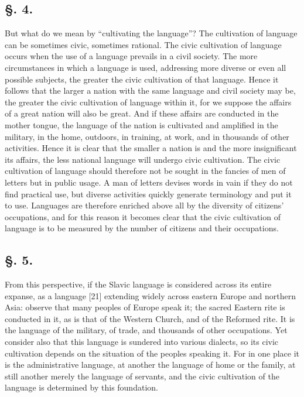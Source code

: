 \subsection*{\hspace*{\fill}§. 4.\hspace*{\fill}}

But what do we mean by “cultivating the language”? The cultivation of language can be sometimes civic, sometimes rational. The civic cultivation of language occurs when the use of a language prevails in a civil society. The more circumstances in which a language is used, addressing more diverse or even all possible subjects, the greater the civic cultivation of that language. Hence it follows that the larger a nation with the same language and civil society may be, the greater the civic cultivation of language within it, for we suppose the affairs of a great nation will also be great. And if these affairs are conducted in the mother tongue, the language of the nation is cultivated and amplified in the military, in the home, outdoors, in training, at work, and in thousands of other activities. Hence it is clear that the smaller a nation is and the more insignificant its affairs, the less national language will undergo civic cultivation. The civic cultivation of language should therefore not be sought in the fancies of men of letters but in public usage. A man of letters devises words in vain if they do not find practical use, but diverse activities quickly generate terminology and put it to use. Languages are therefore enriched above all by the diversity of citizens’ occupations, and for this reason it becomes clear that the civic cultivation of language is to be measured by the number of citizens and their occupations.

\subsection*{\hspace*{\fill}§. 5.\hspace*{\fill}}

From this perspective, if the Slavic language is considered across its entire expanse, as a language [21] extending widely across eastern Europe and northern Asia: observe that many peoples of Europe speak it; the sacred Eastern rite is conducted in it, as is that of the Western Church, and of the Reformed rite. It is the language of the military, of trade, and thousands of other occupations. Yet consider also that this language is sundered into various dialects, so its civic cultivation depends on the situation of the peoples speaking it. For in one place it is the administrative language, at another the language of home or the family, at still another merely the language of servants, and the civic cultivation of the language is determined by this foundation.

